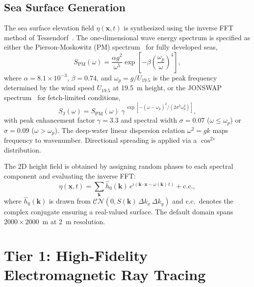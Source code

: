 \documentclass[conf]{new-aiaa}
\begin{document}
\subsection{Sea Surface Generation}
The sea surface elevation field $\eta(\mathbf{x}, t)$ is synthesized using the inverse FFT method of Tessendorf~\cite{Tessendorf2001}. The one-dimensional wave energy spectrum is specified as either the Pierson-Moskowitz (PM) spectrum~\cite{Pierson1964} for fully developed seas,
\begin{equation}\label{eq:pm}
S_{\mathrm{PM}}(\omega) = \frac{\alpha g^2}{\omega^5} \exp\!\left[-\beta\left(\frac{\omega_p}{\omega}\right)^{\!4}\right],
\end{equation}
where $\alpha = 8.1 \times 10^{-3}$, $\beta = 0.74$, and $\omega_p = g / U_{19.5}$ is the peak frequency determined by the wind speed $U_{19.5}$ at 19.5~m height, or the JONSWAP spectrum~\cite{Hasselmann1973} for fetch-limited conditions,
\begin{equation}\label{eq:jonswap}
S_{\mathrm{J}}(\omega) = S_{\mathrm{PM}}(\omega)\;\gamma^{\,\exp\!\left[-({\omega - \omega_p})^2 / (2\sigma^2\omega_p^2)\right]},
\end{equation}
with peak enhancement factor $\gamma = 3.3$ and spectral width $\sigma = 0.07$ ($\omega \leq \omega_p$) or $\sigma = 0.09$ ($\omega > \omega_p$). The deep-water linear dispersion relation $\omega^2 = gk$ maps frequency to wavenumber. Directional spreading is applied via a $\cos^{2s}$ distribution.

The 2D height field is obtained by assigning random phases to each spectral component and evaluating the inverse FFT:
\begin{equation}\label{eq:ifft_sea}
\eta(\mathbf{x}, t) = \sum_{\mathbf{k}} \hat{h}_0(\mathbf{k})\, e^{i(\mathbf{k}\cdot\mathbf{x} - \omega(\mathbf{k})\,t)} + \text{c.c.},
\end{equation}
where $\hat{h}_0(\mathbf{k})$ is drawn from $\mathcal{CN}(0, S(\mathbf{k})\,\Delta k_x\,\Delta k_y)$ and c.c.\ denotes the complex conjugate ensuring a real-valued surface. The default domain spans $2000 \times 2000$~m at 2~m resolution.

\section{Tier 1: High-Fidelity Electromagnetic Ray Tracing}\label{sec:tier1}
\end{document}
